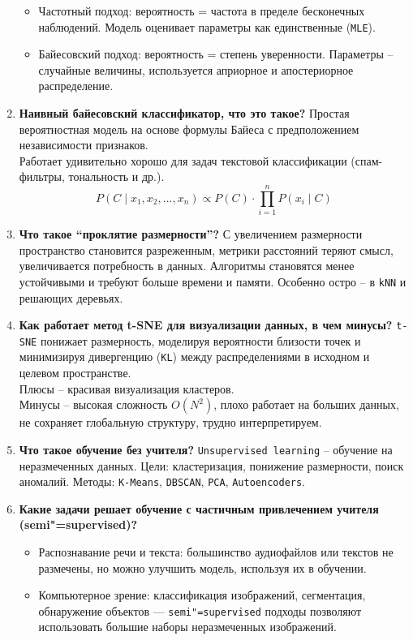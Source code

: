 \documentclass{article}
\begin{document}
\begin{enumerate}
    \begin{itemize}
        \item Частотный подход: вероятность = частота в пределе бесконечных наблюдений. Модель оценивает параметры как единственные (\texttt{MLE}).
        \item Байесовский подход: вероятность = степень уверенности. Параметры -- случайные величины, используется априорное и апостериорное распределение.
    \end{itemize}
    \item \textbf{Наивный байесовский классификатор, что это такое?} Простая вероятностная модель на основе формулы Байеса с предположением независимости признаков. \\
    Работает удивительно хорошо для задач текстовой классификации (спам-фильтры, тональность и др.). \\
    $$
    P(C \mid x_1, x_2, \ldots, x_n) \propto P(C) \cdot \prod_{i=1}^{n} P(x_i \mid C)
    $$
    \item \textbf{Что такое ``проклятие размерности''?} С увеличением размерности пространство становится разреженным, метрики расстояний теряют смысл, увеличивается потребность в данных. Алгоритмы становятся менее устойчивыми и требуют больше времени и памяти. Особенно остро -- в \texttt{kNN} и решающих деревьях.
    \item \textbf{Как работает метод t-SNE для визуализации данных, в чем минусы?} \texttt{t-SNE} понижает размерность, моделируя вероятности близости точек и минимизируя дивергенцию (\texttt{KL}) между распределениями в исходном и целевом пространстве. \\
    Плюсы -- красивая визуализация кластеров. \\
    Минусы -- высокая сложность $O(N^2)$, плохо работает на больших данных, не сохраняет глобальную структуру, трудно интерпретируем.
    \item \textbf{Что такое обучение без учителя?} \texttt{Unsupervised learning} -- обучение на неразмеченных данных. Цели: кластеризация, понижение размерности, поиск аномалий. Методы: \texttt{K-Means}, \texttt{DBSCAN}, \texttt{PCA}, \texttt{Autoencoders}.
    \item \textbf{Какие задачи решает обучение с частичным привлечением учителя (semi"=supervised)?}
    \begin{itemize}
        \item Распознавание речи и текста: большинство аудиофайлов или текстов не размечены, но можно улучшить модель, используя их в обучении.
        \item Компьютерное зрение: классификация изображений, сегментация, обнаружение объектов — \texttt{semi"=supervised} подходы позволяют использовать большие наборы неразмеченных изображений.

\end{itemize}
\end{enumerate}
\end{document}
